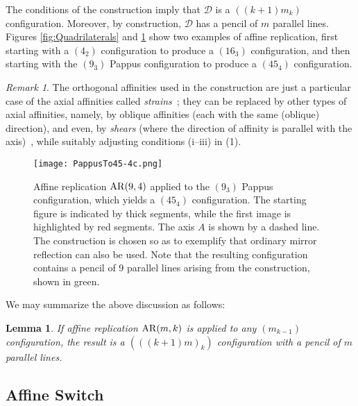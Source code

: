 \documentclass[reqno,12pt]{amsart}
\theoremstyle{plain}
\newtheorem{lemma}[theorem]{Lemma}
\theoremstyle{definition}
\theoremstyle{remark}
\newtheorem{remark}{Remark}
\newcommand{\mc}[1]{\mathcal{#1}}
\begin{document}
\noindent
The conditions of the construction imply that $\mc{D}$ is a $((k+1)m_{k})$ configuration. 
Moreover, by construction, $\mc{D}$ has a pencil of $m$ parallel lines. Figures \ref{fig:Quadrilaterals} and \ref{fig:PappusExt} 
show two examples of affine replication, first starting with a $(4_{2})$ configuration to produce a $(16_{3})$ configuration, and 
then starting with the $(9_{3})$ Pappus configuration to produce a $(45_{4})$ configuration.

\begin{remark}
The orthogonal affinities used in the construction are just a particular case of the axial affinities called \emph{strains}~\cite{Cox1969}; 
they can be replaced by other types of axial affinities, namely, by oblique affinities (each with the same (oblique) direction), and even, 
by \emph{shears} (where the direction of affinity is parallel with the axis)~\cite{Cox1969}, while suitably adjusting conditions (i--iii) in (1).
\end{remark}

\begin{figure}[h!]
\begin{center}
\texttt{[image: PappusTo45-4c.png]}%
\caption{Affine replication $\mathrm{AR}(9,4)$ applied to the $(9_3)$ Pappus configuration, which yields a $(45_4)$ configuration. 
The starting figure is indicated by thick segments, while the first image is highlighted by red segments. The axis $A$ is shown by a dashed line. 
The construction is chosen so as to exemplify that ordinary mirror reflection can also be used. Note that the resulting configuration contains a 
pencil of 9 parallel lines arising from the construction, shown in green.    %
}
\label{fig:PappusExt}
\end{center}
\end{figure}

We may summarize the above discussion as follows:

\begin{lemma}\label{lemma:kp1}
If affine replication $\mathrm{AR}(m, k)$ is applied to any $(m_{k-1})$ configuration, the result is 
a $(((k+1)m)_k)$ configuration with a pencil of $m$ parallel lines.
\end{lemma}

\subsection{Affine Switch}
\end{document}
